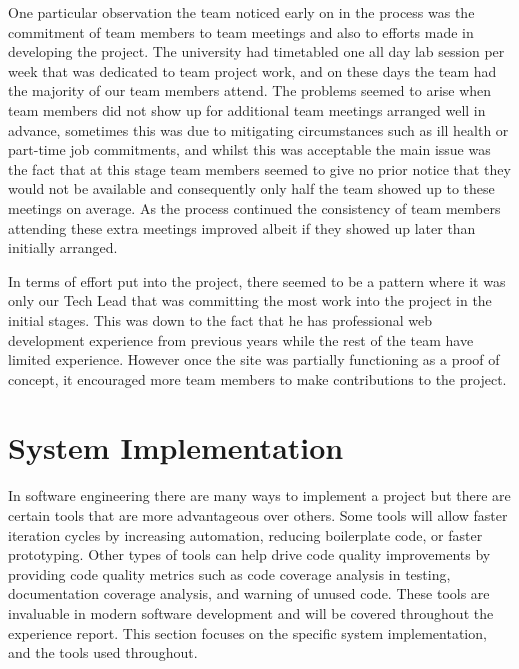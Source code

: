 \documentclass{l3proj}
\begin{document}
One particular observation the team noticed early on in the process was the commitment of team members to team meetings and also
to efforts made in developing the project. The university had timetabled one all day lab session per week that was dedicated
to team project work, and on these days the team had the majority of our team members attend. The problems seemed to arise when
team members did not show up for additional team meetings arranged well in advance, sometimes this was due to mitigating
circumstances such as ill health or part-time job commitments, and whilst this was acceptable the main issue was the fact
that at this stage team members seemed to give no prior notice that they would not be available and consequently only
half the team showed up to these meetings on average. As the process continued the consistency of team members attending these
extra meetings improved albeit if they showed up later than initially arranged.

In terms of effort put into the project, there seemed to be a pattern where it was only our Tech Lead that was committing the most
work into the project in the initial stages. This was down to the fact that he has professional web development experience from previous
years while the rest of the team have limited experience. However once the site was partially functioning as a proof of concept, it
encouraged more team members to make contributions to the project.




\section{System Implementation}
\label{sec:system-implementation}

In software engineering there are many ways to implement a project but there are certain tools that are more advantageous over others. Some tools will allow faster iteration cycles by increasing automation, reducing boilerplate code, or faster prototyping. Other types of tools can help drive code quality improvements by providing code quality metrics such as code coverage analysis in testing, documentation coverage analysis, and warning of unused code. These tools are invaluable in modern software development and will be covered throughout the experience report. This section focuses on the specific system implementation, and the tools used throughout.
\end{document}
